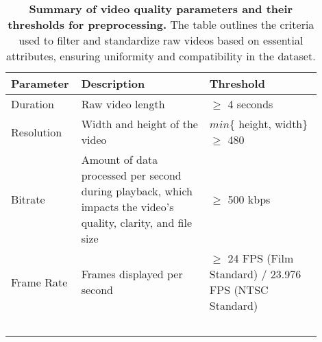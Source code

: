 \begin{table}[t]
    \centering
    \begin{tabular}{m{0.15\linewidth} m{0.4\linewidth} m{0.35\linewidth}}
        \toprule
        Parameter & Description & Threshold  \\ \midrule
        Duration & Raw video length & $\geq$ 4 seconds  \\ \midrule
        Resolution & Width and height of the video & $min$\{ height, width\} $\geq$ 480 \\ \midrule
        Bitrate & Amount of data processed per second during playback, which impacts the video's quality, clarity, and file size & $\geq$ 500 kbps \\ \midrule
        Frame Rate & Frames displayed per second & $\geq$ 24 FPS (Film Standard) / 23.976 FPS (NTSC Standard) \\ 
        \bottomrule
        \
    \end{tabular}
    \caption{\textbf{Summary of video quality parameters and their thresholds for preprocessing.} The table outlines the criteria used to filter and standardize raw videos based on essential attributes, ensuring uniformity and compatibility in the dataset.}\label{tab:video-basic-parameters}
\end{table}



